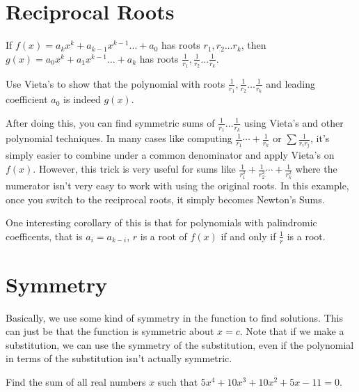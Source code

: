 \documentclass{article}
\begin{document}
\section{Reciprocal Roots}
\begin{theo}
If $f(x)=a_{k}x^{k}+a_{k-1}x^{k-1}\ldots + a_{0}$ has roots $r_{1},r_{2}\ldots r_{k}$, then $g(x)=a_{0}x^{k}+a_{1}x^{k-1}\ldots + a_{k}$ has roots $\frac{1}{r_{1}}, \frac{1}{r_{2}}\ldots \frac{1}{r_{k}}$.
\end{theo}

\begin{pro}
Use Vieta\rq{}s  to show that the polynomial with roots $\frac{1}{r_{1}}, \frac{1}{r_{2}}\ldots \frac{1}{r_{k}}$ and leading coefficient $a_{0}$ is indeed $g(x)$.
\end{pro}

After doing this, you can find symmetric sums of $\frac{1}{r_{1}} \ldots \frac{1}{r_{k}}$ using Vieta\rq{}s and other polynomial techniques. In many cases like computing $\frac{1}{r_{1}}\cdots + \frac{1}{r_{k}}$ or $\sum \frac{1}{r_{i}r_{j}}$, it\rq{}s simply easier to combine under a common denominator and apply Vieta\rq{}s on $f(x)$. However, this trick is very useful for sums like $\frac{1}{r_{1}^2}+\frac{1}{r_{2}^2}\cdots  + \frac{1}{r_{k}^2}$ where the numerator isn\rq{}t very easy to work with using the original roots. In this example, once you switch to the reciprocal roots, it simply becomes Newton\rq{}s Sums.

One interesting corollary of this is that for polynomials with palindromic coefficents, that is $a_{i}=a_{k-i}$, $r$ is a root of $f(x)$ if and only if $\frac{1}{r}$ is a root.


\newpage
\section{Symmetry}
Basically, we use some kind of symmetry in the function to find solutions. This can just be that the function is symmetric about $x=c$. Note that if we make a substitution, we can use the symmetry of the substitution, even if the polynomial in terms of the substitution isn't actually symmetric.
\begin{exam}
Find the sum of all real numbers $x$ such that $5x^4+10x^3 + 10x^2+5x-11 = 0.$
\end{exam}
\end{document}
